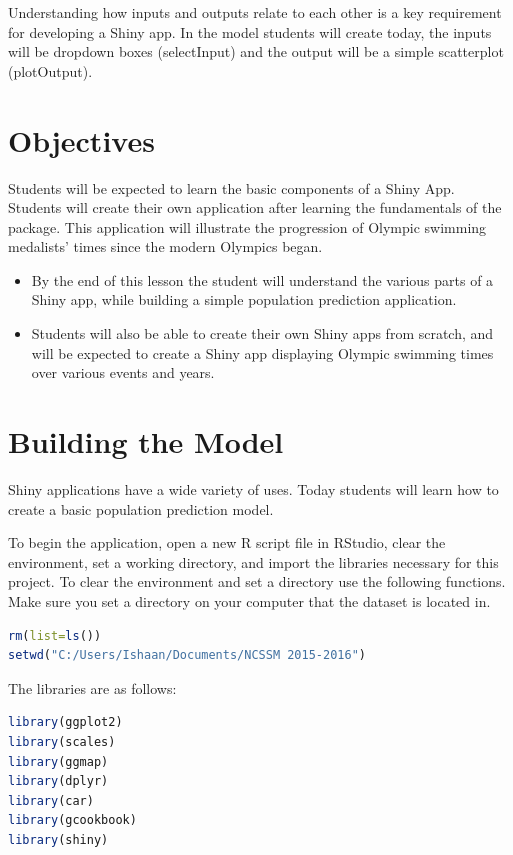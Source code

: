 Understanding how inputs and outputs relate to each other is a key requirement for developing a Shiny app.
In the model students will create today, the inputs will be dropdown boxes (selectInput) and the output will be a simple scatterplot (plotOutput). 

\section{Objectives}
Students will be expected to learn the basic components of a Shiny App.
Students will create their own application after learning the fundamentals of the package.
This application will illustrate the progression of Olympic swimming medalists' times since the modern Olympics began. 
\begin{itemize}
\item By the end of this lesson the student will understand the various parts of a Shiny app, while building a simple population prediction application.
\item Students will also be able to create their own Shiny apps from scratch, and will be expected to create a Shiny app displaying Olympic swimming times over various events and years.
\end{itemize}
\section{Building the Model}

Shiny applications have a wide variety of uses. Today students will learn how to create a basic population prediction model. 

\noindent To begin the application, open a new R script file in RStudio, clear the environment, set a working directory, and import the libraries necessary for this project. To clear the environment and set a directory use the following functions. Make sure you set a directory on your computer that the dataset is located in. 

\begin{lstlisting}[language = R]
rm(list=ls())
setwd("C:/Users/Ishaan/Documents/NCSSM 2015-2016")
\end{lstlisting}

\noindent The libraries are as follows:

\begin{lstlisting}[language = R]
library(ggplot2)
library(scales)
library(ggmap)
library(dplyr)
library(car)
library(gcookbook)
library(shiny)
\end{lstlisting}


